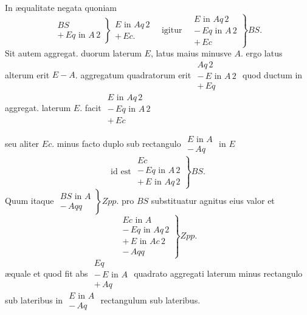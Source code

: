 \documentclass[11pt,a4paper]{article}
\begin{document}
In æqualitate  negata quoniam
\[ \left.\begin{array}{l} BS \\ +\,Eq \text{ in } A\,2 \end{array}\right\} \begin{array}{l} E \text{ in } Aq\,2 \\ +\,Ec. \end{array} \quad \text{igitur} \quad \left.\begin{array}{l} E \text{ in } Aq\,2 \\ -\,Eq \text{ in } A\,2 \\ +\,Ec \end{array}\right\} BS. \]
Sit autem aggregat. duorum laterum \struck{\ill{}} $E$, latus maius minusve $A$. ergo latus alterum erit $E - A$. aggregatum quadratorum erit $\begin{array}{l} Aq\,2 \\ -\,E \text{ in } A\,2 \\ +\,Eq \end{array}$ quod ductum in aggregat. laterum $E$. facit $\begin{array}{l} E \text{ in } Aq\,2 \\ -\,Eq \text{ in } A\,2 \\ +\,Ec \end{array}$

seu aliter $Ec$. minus facto duplo sub rectangulo $\begin{array}{l} E \text{ in } A \\ -\,Aq \end{array}$ in $E$
\[ \text{id est } \left.\begin{array}{l} Ec \\ -\,Eq \text{ in } A\,2 \\ +\,E \text{ in } Aq\,2 \end{array}\right\} BS. \]
Quum itaque $\left.\begin{array}{l} BS \text{ in } A \\ -\,Aqq \end{array}\right\} Zpp.$ pro $BS$ substituatur agnitus eius valor et
\[ \left.\begin{array}{l} Ec \text{ in } A \\ -\,Eq \text{ in } Aq\,2 \\ +\,E \text{ in } Ac\,2 \\ -\,Aqq \end{array}\right\} Zpp. \]
æquale et quod fit abs $\begin{array}{l} Eq \\ -\,E \text{ in } A \\ +\,Aq \end{array}$ quadrato aggregati laterum minus rectangulo sub lateribus in $\begin{array}{l} E \text{ in } A \\ -\,Aq \end{array}$ rectangulum sub lateribus.
\end{document}
